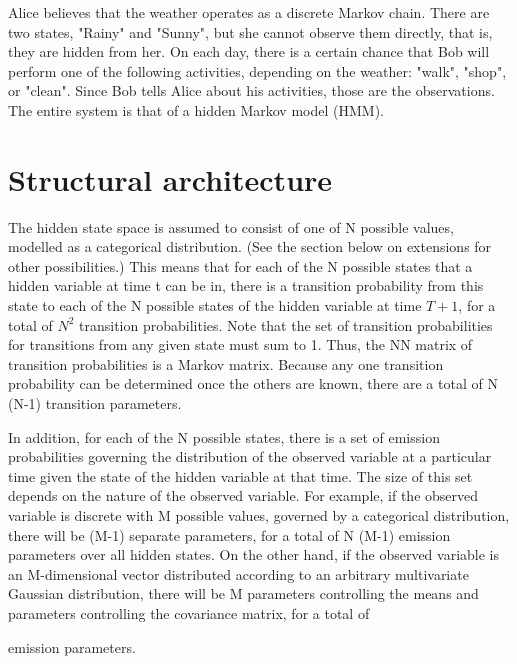 \documentclass[a4paper,10pt]{article} %
\begin{document}
Alice believes that the weather operates as a discrete Markov chain. There are two states, "Rainy" and "Sunny", but she cannot observe them directly, that is, they are hidden from her. On each day, there is a certain chance that Bob will perform one of the following activities, depending on the weather: "walk", "shop", or "clean". Since Bob tells Alice about his activities, those are the observations. The entire system is that of a hidden Markov model (HMM).

\section{Structural architecture}
The hidden state space is assumed to consist of one of N possible values, modelled as a categorical distribution. (See the section below on extensions for other possibilities.) This means that for each of the N possible states that a hidden variable at time t can be in, there is a transition probability from this state to each of the N possible states of the hidden variable at time $T+1$, for a total of $N^{2}$ transition probabilities. Note that the set of transition probabilities for transitions from any given state must sum to 1. Thus, the N\times N matrix of transition probabilities is a Markov matrix. Because any one transition probability can be determined once the others are known, there are a total of  N \times (N-1) transition parameters.

In addition, for each of the N possible states, there is a set of emission probabilities governing the distribution of the observed variable at a particular time given the state of the hidden variable at that time. The size of this set depends on the nature of the observed variable. For example, if the observed variable is discrete with M possible values, governed by a categorical distribution, there will be (M-1) separate parameters, for a total of N \times (M-1) emission parameters over all hidden states. On the other hand, if the observed variable is an M-dimensional vector distributed according to an arbitrary multivariate Gaussian distribution, there will be M parameters controlling the means and {} parameters controlling the covariance matrix, for a total of 



  emission parameters.
\end{document}
